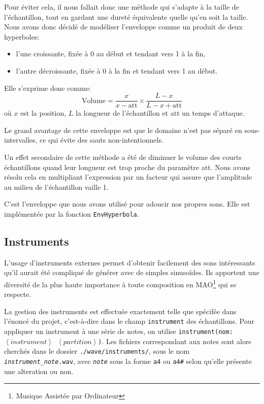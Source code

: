 \documentclass[a4paper,12pt]{article}
\begin{document}
\begin{itemize}
        Pour éviter cela, il nous fallait donc une méthode qui s'adapte
        à la taille de l'échantillon, tout en gardant une dureté équivalente
        quelle qu'en soit la taille.
        Nous avons donc décidé de modéliser l'enveloppe comme un produit
        de deux hyperboles:
        \begin{itemize}
            \item l'une croissante,
                fixée à 0 au début et tendant vers 1 à la fin,
            \item l'autre décroissante,
                fixée à 0 à la fin et tendant vers 1 au début.
        \end{itemize}
        Elle s'exprime donc comme:
        \[
            \mbox{Volume} = \frac{x}{x-\mbox{att}} \times
                \frac{L-x}{L-x+\mbox{att}}
        \]
        où $x$ est la position, $L$ la longueur de l'échantillon et
        att un temps d'attaque.
        
        Le grand avantage de cette enveloppe est que le domaine n'est pas
        séparé en sous-intervalles, ce qui évite des sauts non-intentionnels.
        
        Un effet secondaire de cette méthode a été de diminuer le volume des
        courts échantillons quand leur longueur est trop proche du paramètre
        att.
        Nous avons résolu cela en multipliant l'expression par un facteur
        qui assure que l'amplitude au milieu de l'échantillon vaille 1.
        
        C'est l'enveloppe que nous avons utilisé pour adoucir nos propres sons.
        Elle est implémentée par la fonction \texttt{EnvHyperbola}.
\end{itemize}

\subsection{Instruments}

L'usage d'instruments externes permet d'obtenir facilement des sons intéressants qu'il aurait été compliqué de générer avec de simples sinusoïdes. Ils apportent une diversité de la plus haute importance à toute composition en MAO\footnote{Musique Assistée par Ordinateur} qui se respecte.

La gestion des instruments est effectuée exactement telle que spécifée dans l'énoncé du projet, c'est-à-dire dans le champ \texttt{instrument} des échantillons. Pour appliquer un instrument à une série de notes, on utilise \texttt{instrument(nom:$\left<instrument\right>$ $\left<partition\right>$)}. Les fichiers correspondant aux notes sont alors cherchés dans le dossier \texttt{./wave/instruments/}, sous le nom \texttt{\textit{instrument}\_\textit{note}.wav}, avec \texttt{\textit{note}} sous la forme \texttt{a4} ou \texttt{a4\#} selon qu'elle présente une alteration ou non.
\end{document}
